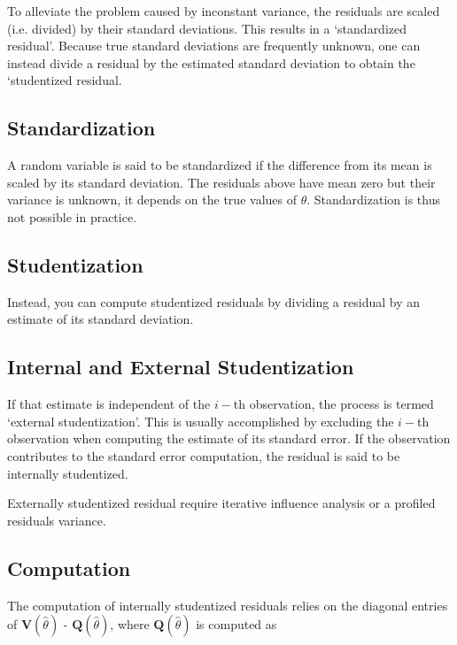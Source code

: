 \documentclass[Main.tex]{subfiles}
\begin{document}
	To alleviate the problem caused by inconstant variance, the residuals are scaled (i.e. divided) by their standard deviations. This results in a `standardized residual'. Because true standard deviations are frequently unknown, one can instead divide a residual by the estimated standard deviation to obtain the `studentized residual. 
	
	\subsection{Standardization} %
	
	A random variable is said to be standardized if the difference from its mean is scaled by its standard deviation. The residuals above have mean zero but their variance is unknown, it depends on the true values of $\theta$. Standardization is thus not possible in practice.
	
	\subsection{Studentization} %
	Instead, you can compute studentized residuals by dividing a residual by an estimate of its standard deviation. 
	
	\subsection{Internal and External Studentization} %
	If that estimate is independent of the $i-$th observation, the process is termed `external studentization'. This is usually accomplished by excluding the $i-$th observation when computing the estimate of its standard error. If the observation contributes to the
	standard error computation, the residual is said to be internally studentized.
	
	Externally  studentized residual require iterative influence analysis or a profiled residuals variance.
	
	
	\subsection{Computation}%
	
	The computation of internally studentized residuals relies on the diagonal entries of $\boldsymbol{V} (\hat{\theta})$ - $\boldsymbol{Q} (\hat{\theta})$, where $\boldsymbol{Q} (\hat{\theta})$ is computed as
	
\end{document}
